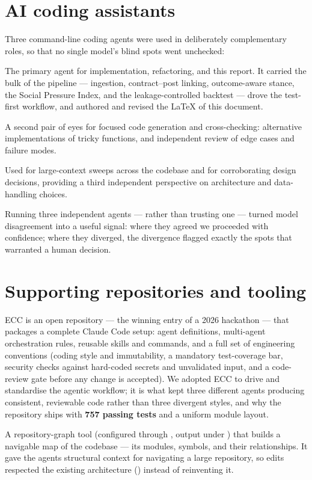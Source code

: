 \section{AI coding assistants}
Three command-line coding agents were used in deliberately complementary roles, so that
no single model's blind spots went unchecked:
\begin{description}[leftmargin=1.4em,style=nextline]
  \item[Claude Code (Anthropic).] The primary agent for implementation, refactoring, and
  this report. It carried the bulk of the pipeline --- ingestion, contract--post linking,
  outcome-aware stance, the Social Pressure Index, and the leakage-controlled backtest ---
  drove the test-first workflow, and authored and revised the \LaTeX{} of this document.
  \item[Codex (OpenAI).] A second pair of eyes for focused code generation and
  cross-checking: alternative implementations of tricky functions, and independent review
  of edge cases and failure modes.
  \item[Gemini CLI (Google).] Used for large-context sweeps across the codebase and for
  corroborating design decisions, providing a third independent perspective on
  architecture and data-handling choices.
\end{description}
Running three independent agents --- rather than trusting one --- turned model
disagreement into a useful signal: where they agreed we proceeded with confidence; where
they diverged, the divergence flagged exactly the spots that warranted a human decision.

\section{Supporting repositories and tooling}
\begin{description}[leftmargin=1.4em,style=nextline]
  \item[ECC --- a comprehensive ``everything Claude Code'' framework.] ECC is an open
  repository --- the winning entry of a 2026 hackathon --- that packages a complete Claude
  Code setup: agent definitions, multi-agent orchestration rules, reusable skills and
  commands, and a full set of engineering conventions (coding style and immutability, a
  mandatory test-coverage bar, security checks against hard-coded secrets and unvalidated
  input, and a code-review gate before any change is accepted). We adopted ECC to drive
  and standardise the agentic workflow; it is what kept three different agents producing
  consistent, reviewable code rather than three divergent styles, and why the repository
  ships with \textbf{757 passing tests} and a uniform module layout.
  \item[Graphify.] A repository-graph tool (configured through ,
  output under ) that builds a navigable map of the codebase --- its
  modules, symbols, and their relationships. It gave the agents structural context for
  navigating a large repository, so edits respected the existing architecture
  () instead of reinventing it.
\end{description}

